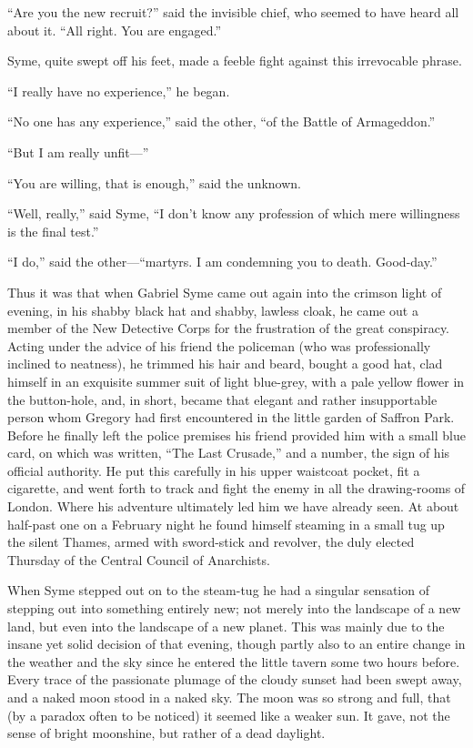 \documentclass{book}
\begin{document}
“Are you the new recruit?” said the invisible chief, who seemed to have heard all about it. “All right. You are engaged.”

Syme, quite swept off his feet, made a feeble fight against this irrevocable phrase.

“I really have no experience,” he began.

“No one has any experience,” said the other, “of the Battle of Armageddon.”

“But I am really unfit—”

“You are willing, that is enough,” said the unknown.

“Well, really,” said Syme, “I don’t know any profession of which mere willingness is the final test.”

“I do,” said the other—“martyrs. I am condemning you to death. Good-day.”

Thus it was that when Gabriel Syme came out again into the crimson light of evening, in his shabby black hat and shabby, lawless cloak, he came out a member of the New Detective Corps for the frustration of the great conspiracy. Acting under the advice of his friend the policeman (who was professionally inclined to neatness), he trimmed his hair and beard, bought a good hat, clad himself in an exquisite summer suit of light blue-grey, with a pale yellow flower in the button-hole, and, in short, became that elegant and rather insupportable person whom Gregory had first encountered in the little garden of Saffron Park. Before he finally left the police premises his friend provided him with a small blue card, on which was written, “The Last Crusade,” and a number, the sign of his official authority. He put this carefully in his upper waistcoat pocket, fit a cigarette, and went forth to track and fight the enemy in all the drawing-rooms of London. Where his adventure ultimately led him we have already seen. At about half-past one on a February night he found himself steaming in a small tug up the silent Thames, armed with sword-stick and revolver, the duly elected Thursday of the Central Council of Anarchists.

When Syme stepped out on to the steam-tug he had a singular sensation of stepping out into something entirely new; not merely into the landscape of a new land, but even into the landscape of a new planet. This was mainly due to the insane yet solid decision of that evening, though partly also to an entire change in the weather and the sky since he entered the little tavern some two hours before. Every trace of the passionate plumage of the cloudy sunset had been swept away, and a naked moon stood in a naked sky. The moon was so strong and full, that (by a paradox often to be noticed) it seemed like a weaker sun. It gave, not the sense of bright moonshine, but rather of a dead daylight.
\end{document}
